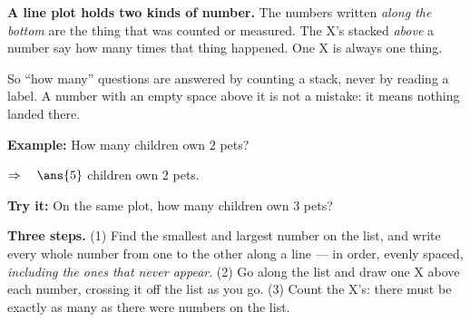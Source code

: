 \documentclass[12pt]{article}
\begin{document}
\newlength{\figcol}\setlength{\figcol}{0.50\linewidth}
\newlength{\qcol}\setlength{\qcol}{0.46\linewidth}



\begin{formulabox}
\textbf{A line plot holds two kinds of number.} The numbers written \emph{along the bottom}
are the thing that was counted or measured. The \textsf{X}'s stacked \emph{above} a number
say how many times that thing happened. One \textsf{X} is always one thing.\par
\smallskip
So ``how many'' questions are answered by counting a stack, never by reading a label. A
number with an empty space above it is not a mistake: it means nothing landed there.
\end{formulabox}

\begin{examplebox}
\textbf{Example:} \quad How many children own $2$ pets?
\begin{center}
\end{center}

$\Rightarrow\quad \ans{5}$ children own $2$ pets.
\end{examplebox}

\begin{tryitbox}
\textbf{Try it:} \quad On the same plot, how many children own $3$ pets?\\[2pt]
\end{tryitbox}


\begin{formulabox}
\textbf{Three steps.} (1) Find the smallest and largest number on the list, and write every
whole number from one to the other along a line --- in order, evenly spaced, \emph{including
the ones that never appear}. (2) Go along the list and draw one \textsf{X} above each number,
crossing it off the list as you go. (3) Count the \textsf{X}'s: there must be exactly as many
as there were numbers on the list.
\end{formulabox}
\end{document}
